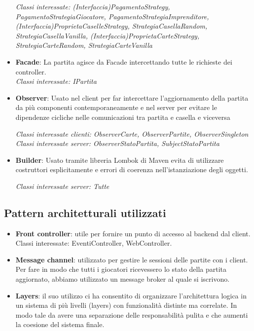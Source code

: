 \documentclass{article}
\begin{document}
\begin{itemize}
         \textit{Classi interessate: (Interfaccia)PagamentoStrategy, PagamentoStrategiaGiocatore, PagamentoStrategiaImprenditore, (Interfaccia)ProprietaCaselleStrategy, StrategiaCasellaRandom, StrategiaCasellaVanilla, (Interfaccia)ProprietaCarteStrategy, StrategiaCarteRandom, StrategiaCarteVanilla}
         
         
         \item \textbf{Facade}: La partita agisce da Facade intercettando tutte le richieste dei controller. \\
         \textit{Classi interessate: IPartita}
         
         
         \item \textbf{Observer}: Usato nel client per far intercettare l’aggiornamento della partita da più componenti contemporaneamente e nel server per evitare le dipendenze cicliche nelle comunicazioni tra partita e casella e viceversa
         
         \textit{Classi interessate clienti: ObserverCarte, ObserverPartite, ObserverSingleton}
         \textit{Classi interessate server: ObserverStatoPartita, SubjectStatoPartita}

         \item \textbf{Builder}: Usato tramite libreria Lombok di Maven evita di utilizzare costruttori esplicitamente e errori di coerenza nell'istanziazione degli oggetti.
         
         \textit{Classi interessate server: Tutte}
         
    \end{itemize}

\subsection{Pattern architetturali utilizzati}
    \begin{itemize}
        \item \textbf{Front controller}: utile per fornire un punto di accesso al backend dal client. Classi interessate: EventiController, WebController.
        \item \textbf{Message channel}: utilizzato per gestire le sessioni delle partite con i client. Per fare in modo che tutti i giocatori ricevessero lo stato della partita aggiornato, abbiamo utilizzato un message broker al quale si iscrivono.
        \item \textbf{Layers}: il suo utilizzo ci ha consentito di organizzare l’architettura logica in un sistema di più livelli (layers) con funzionalità distinte ma correlate. In modo tale da avere una separazione delle responsabilità pulita e che aumenti la coesione del sistema finale.
    \end{itemize}
    
\end{document}
